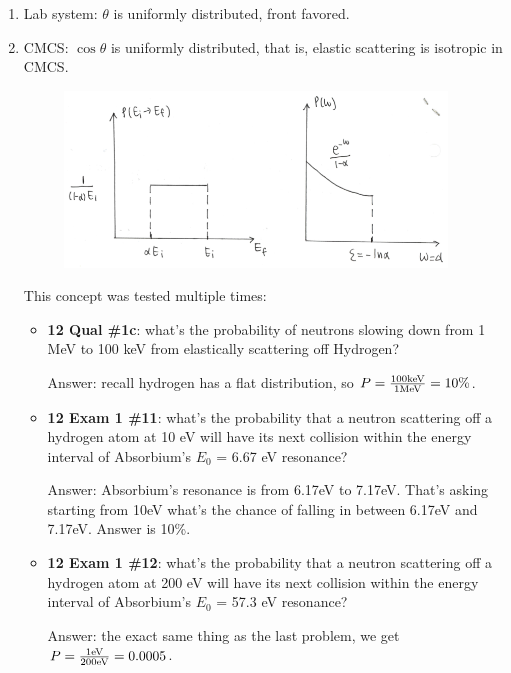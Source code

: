 \documentclass{school-22.211-notes}
\begin{document}
\clearpage
{} 
\begin{enumerate}
\item Lab system: $\theta$ is uniformly distributed, front favored. 

\item CMCS: $\cos \theta$ is uniformly distributed, that is, elastic scattering is isotropic in CMCS. 
  \begin{figure}[ht]
    \centering
    \includegraphics[width=4in]{images/sl-d/prob.png}
  \end{figure}


  This concept was tested multiple times:
  \begin{itemize}
    \item  \textbf{12 Qual \#1c}: what's the probability of neutrons slowing down from 1 MeV to 100 keV from elastically scattering off Hydrogen? 

      Answer: recall hydrogen has a flat distribution, so $P = \frac{100 \mathrm{keV}}{1 \mathrm{MeV}} = 10\%$. 
    \item \textbf{12 Exam 1 \#11}: what's the probability that a neutron scattering off a hydrogen atom at 10 eV will have its next collision within the energy interval of Absorbium's $E_0$ = 6.67 eV resonance? 

      Answer: Absorbium's resonance is from 6.17eV to 7.17eV. That's asking starting from 10eV what's the chance of falling in between 6.17eV and 7.17eV. Answer is 10\%. 

    \item \textbf{12 Exam 1 \#12}: what's the probability that a neutron scattering off a hydrogen atom at 200 eV will have its next collision within the energy interval of Absorbium's $E_0$ = 57.3 eV resonance? 

      Answer: the exact same thing as the last problem, we get $P = \frac{1 \mathrm{eV}}{200 \mathrm{eV}} = 0.0005$. 
  \end{itemize}

\end{enumerate}
\end{document}
